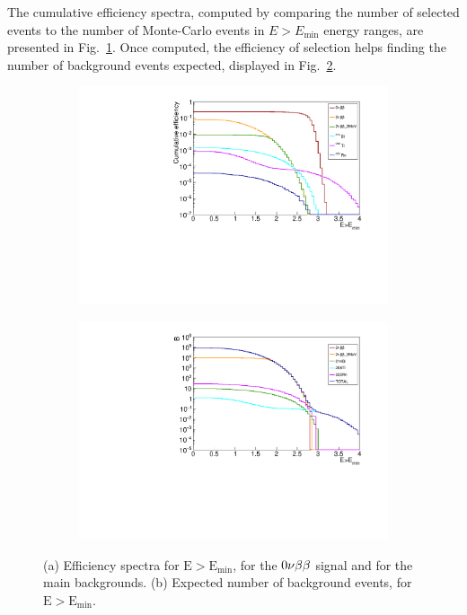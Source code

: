 The cumulative efficiency spectra, computed by comparing the number of selected events to the number of Monte-Carlo events in $E>E_{\text{min}}$ energy ranges, are presented in Fig.~\ref{subfig:sensitivity_efficiency_spectra}.
Once computed, the efficiency of selection helps finding the number of background events expected, displayed in Fig.~\ref{subfig:sensitivity_Nbkg_spectra}.
\begin{figure}[h]
\centering
\begin{subfigure}[t]{0.48\textwidth}
  \centering
  \includegraphics[width=1.1\textwidth]{Sensitivity/fig_sensitivity/efficiency_spectrum_with_B_82Se.pdf}
  \captionsetup{justification=centering}
  \caption{
    \label{subfig:sensitivity_efficiency_spectra}}
\end{subfigure}
\hfill
\begin{subfigure}[t]{0.48\textwidth}
  \centering
  \includegraphics[width=1.1\textwidth]{Sensitivity/fig_sensitivity/Nbackground_spectrum_with_B_82Se.pdf}
  \captionsetup{justification=centering}
  \caption{
    \label{subfig:sensitivity_Nbkg_spectra}}
\end{subfigure}
\caption{(a) Efficiency spectra for $\text{E}>\text{E}_{\text{min}}$, for the $0\nu\beta\beta$ signal and for the main backgrounds.
  (b) Expected number of background events, for $\text{E}>\text{E}_{\text{min}}$.
  \label{fig:Nbkg_eff_spectra}}
\end{figure}

